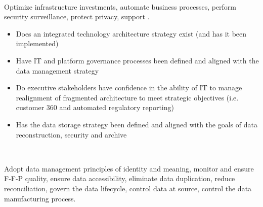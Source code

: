 \begin{description}[nosep,font=\bfseries]
  ~\\

  \item [High-Level Technology Goals]
  Optimize infrastructure investments, automate business processes, 
  perform security surveillance, protect privacy, support . \\

  \begin{itemize}
    \item Does an integrated technology architecture strategy exist (and has it been implemented)
    \item Have IT and platform governance processes been defined and aligned with the data management strategy
    \item Do executive stakeholders have confidence in the ability of IT to manage realignment of fragmented architecture to meet strategic objectives (i.e. customer 360 and automated regulatory reporting)
    \item Has the data storage strategy been defined and aligned with the goals of data reconstruction, security and archive
  \end{itemize}

  ~\\

  \item [High-Level Data Goals]
  Adopt data management principles of identity and meaning,
    monitor and ensure F-F-P quality,
  ensure data accessibility, eliminate data duplication, reduce reconciliation,
  govern the data lifecycle, control data at source, 
  control the data manufacturing process. \\


\end{description}
